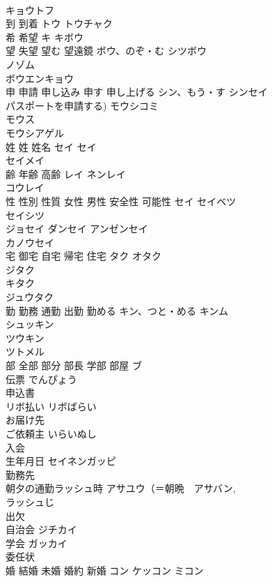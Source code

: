 \documentclass[8pt]{extreport}
\begin{document}
\begin{CJK}{UTF8}{min}
\\	キョウトフ 
\\	到 到着	トウ トウチャク
\\	希 希望	キ キボウ
\\	望 失望 望む 望遠鏡	ボウ、のぞ・む シツボウ
\\	ノゾム
\\	ボウエンキョウ
\\	申 申請 申し込み 申す 申し上げる	シン、もう・す シンセイ
\\	パスポートを申請する) モウシコミ
\\	モウス
\\	モウシアゲル
\\	姓 姓 姓名	セイ セイ　
\\	セイメイ 
\\	齢 年齢 高齢	レイ ネンレイ
\\	コウレイ
\\	性 性別 性質 女性 男性 安全性 可能性	セイ セイベツ
\\	セイシツ
\\	ジョセイ ダンセイ アンゼンセイ
\\	カノウセイ
\\	宅 御宅 自宅 帰宅 住宅	タク オタク
\\	ジタク
\\	キタク
\\	ジュウタク
\\	勤 勤務 通勤 出勤 勤める	キン、つと・める キンム
\\	シュッキン
\\	ツウキン
\\	ツトメル
\\	部 全部 部分 部長 学部 部屋	ブ
\\	伝票	でんぴょう 
\\	申込書	
\\	リボ払い	リボばらい 
\\	お届け先	
\\	ご依頼主	いらいぬし 
\\	入会	
\\	生年月日	セイネンガッピ 
\\	勤務先	
\\	朝夕の通勤ラッシュ時	アサユウ（＝朝晩　アサバン, 
\\	ラッシュじ
\\	出欠	
\\	自治会	ジチカイ 
\\	学会	ガッカイ 
\\	委任状	
\\	婚 結婚 未婚 婚約 新婚	コン ケッコン ミコン 

\end{CJK}
\end{document}
